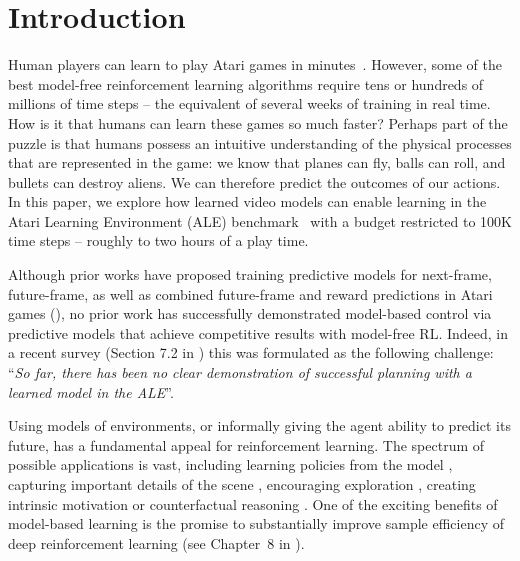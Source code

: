 \section{Introduction}

Human players can learn to play Atari games in minutes~\citep{human_atari_minutes}. However, some of the best model-free reinforcement learning algorithms require tens or hundreds of millions of time steps -- the equivalent of several weeks of training in real time. How is it that humans can learn these games so much faster? Perhaps part of the puzzle is that humans possess an intuitive understanding of the physical processes that are represented in the game: we know that planes can fly, balls can roll, and bullets can destroy aliens. We can therefore predict the outcomes of our actions. In this paper, we explore how learned video models can enable learning in the Atari Learning Environment (ALE) benchmark~\cite{ale, ale2} with a budget restricted to 100K time steps -- roughly to two hours of a play time.

Although prior works have proposed training predictive models for next-frame, future-frame, as well as combined future-frame and reward predictions in Atari games (\cite{video_prediction,recurrent, video_reward_prediction}), no prior work has successfully demonstrated model-based control via predictive models that achieve competitive results with model-free RL. Indeed, in a recent survey (Section 7.2 in \citet{ale2}) this was formulated as the following challenge: ``\emph{So far, there has been no clear demonstration of successful planning with a learned model in the ALE}''.


Using models of environments, or informally giving the agent ability to predict its future, has a fundamental appeal for reinforcement learning. The spectrum of possible applications is vast, including learning policies
from the model \citep[Chapter~8]{embed_to_control, deep_spatial, finn2016, ebert, hafner, piergiovanni, rybkin-pertsch,sutton_barto_2017}, capturing important details of the scene \citep{world_models}, encouraging exploration \citep{video_prediction},  creating intrinsic motivation \citep{schmidhuber_formal_theory} or counterfactual reasoning \citep{woulda_coulda_shoulda}.
One of the exciting benefits of model-based learning is the promise to substantially improve sample efficiency of deep reinforcement learning (see Chapter~8 in \cite{sutton_barto_2017}).


